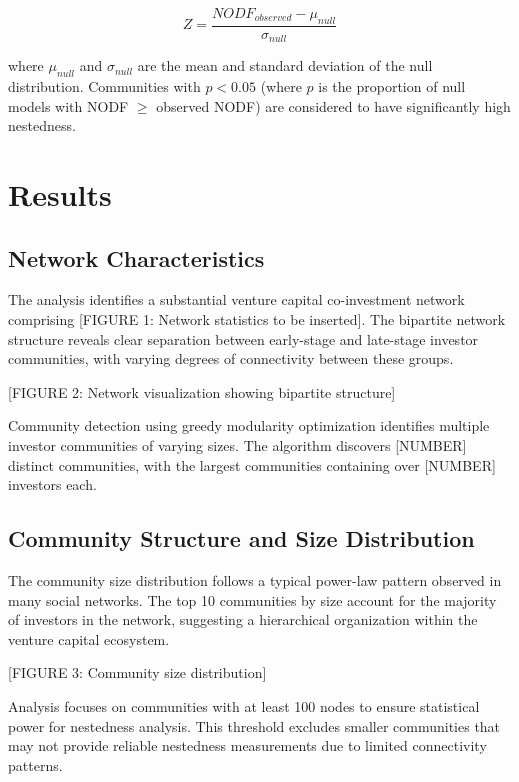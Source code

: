\documentclass[12pt]{article}
\begin{document}
\begin{equation}
Z = \frac{NODF_{observed} - \mu_{null}}{\sigma_{null}}
\end{equation}

where $\mu_{null}$ and $\sigma_{null}$ are the mean and standard deviation of the null distribution. Communities with $p < 0.05$ (where $p$ is the proportion of null models with NODF $\geq$ observed NODF) are considered to have significantly high nestedness.

\section{Results}

\subsection{Network Characteristics}

The analysis identifies a substantial venture capital co-investment network comprising [FIGURE 1: Network statistics to be inserted]. The bipartite network structure reveals clear separation between early-stage and late-stage investor communities, with varying degrees of connectivity between these groups.

[FIGURE 2: Network visualization showing bipartite structure]

Community detection using greedy modularity optimization identifies multiple investor communities of varying sizes. The algorithm discovers [NUMBER] distinct communities, with the largest communities containing over [NUMBER] investors each.

\subsection{Community Structure and Size Distribution}

The community size distribution follows a typical power-law pattern observed in many social networks. The top 10 communities by size account for the majority of investors in the network, suggesting a hierarchical organization within the venture capital ecosystem.

[FIGURE 3: Community size distribution]

Analysis focuses on communities with at least 100 nodes to ensure statistical power for nestedness analysis. This threshold excludes smaller communities that may not provide reliable nestedness measurements due to limited connectivity patterns.
\end{document}
